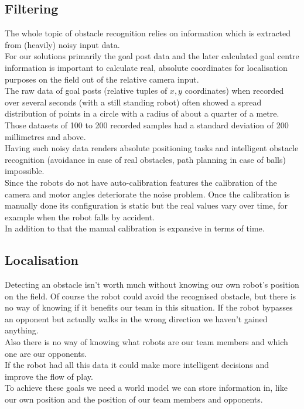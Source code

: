 \documentclass[lnicst,a4paper]{svmultln}
\begin{document}
\subsection{Filtering}
\label{sec:problems_filtering}
The whole topic of obstacle recognition relies on information which is extracted from (heavily) noisy input data.
\\
For our solutions primarily the goal post data and the later calculated goal centre information is important to calculate real, absolute coordinates for localisation purposes on the field out of the relative camera input.
\\
The raw data of goal posts (relative tuples of $x, y$ coordinates) when recorded over several seconds (with a still standing robot) often showed a spread distribution of points in a circle with a radius of about a quarter of a metre. Those datasets of 100 to 200 recorded samples had a standard deviation of 200 millimetres and above.
\\
Having such noisy data renders absolute positioning tasks and intelligent obstacle recognition (avoidance in case of real obstacles, path planning in case of balls) impossible.
\\
Since the robots do not have auto-calibration features the calibration of the camera and motor angles deteriorate the noise problem. Once the calibration is manually done its configuration is static but the real values vary over time, for example when the robot falls by accident.
\\
In addition to that the manual calibration is expansive in terms of time.


\subsection{Localisation}
\label{sec:problems_localisation}
Detecting an obstacle isn't worth much without knowing our own robot's position on the field. Of course the robot could avoid the recognised obstacle, but there is no way of knowing if it benefits our team in this situation. If the robot bypasses an opponent but actually walks in the wrong direction we haven't gained anything. 
\\
Also there is no way of knowing what robots are our team members and which one are our opponents.
\\
If the robot had all this data it could make more intelligent decisions and improve the flow of play.
\\
To achieve these goals we need a world model we can store information in, like our own position and the position of our team members and opponents.
\end{document}
